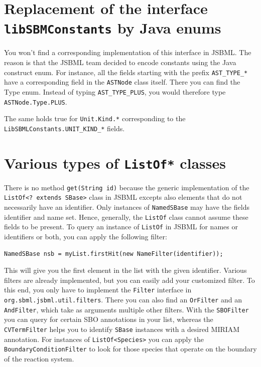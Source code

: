 \documentclass[
  letterpaper,
  11pt,
  headsepline,
  pointlessnumbers,
  tablecaptionabove,
  headinclude,
  appendixprefix,
  idxtotoc,
  bibtotoc
]{scrartcl}
\begin{document}
\section{Replacement of the interface \texttt{libSBMConstants} by Java enums}

You won't find a corresponding implementation of this interface in 
JSBML. The reason is that the JSBML team decided to encode constants using the
Java construct enum. For instance, all the fields starting with the
prefix \verb!AST_TYPE_*! have a corresponding field in the \verb!ASTNode! class
itself. There you can find the Type enum. Instead of typing
\verb!AST_TYPE_PLUS!, you would therefore type \verb!ASTNode.Type.PLUS!.

The same holds true for \verb!Unit.Kind.*! corresponding to the 
\verb!LibSBMLConstants.UNIT_KIND_*! fields.


\section{Various types of \texttt{ListOf*} classes}

There is no method \verb!get(String id)! because the generic implementation of 
the \verb!ListOf<? extends SBase>! class in JSBML excepts also elements that do 
not necessarily have an identifier. Only instances of \verb!NamedSBase! may have
the fields identifier and name set. Hence, generally, the \verb!ListOf! class 
cannot assume these fields to be present. To query an instance of \verb!ListOf! 
in JSBML for names or identifiers or both, you can apply the following 
filter:
\begin{verbatim}
NamedSBase nsb = myList.firstHit(new NameFilter(identifier));
\end{verbatim}
This will give you the first element in the list with the given identifier.
Various filters are already implemented, but you can easily add your 
customized filter. To this end, you only have to implement the \verb!Filter! 
interface in \verb!org.sbml.jsbml.util.filters!. There you can also find an
\verb!OrFilter! and an \verb!AndFilter!, which take as arguments multiple other
filters. With the \verb!SBOFilter! you can query for certain SBO annotations in
your list, whereas the \verb!CVTermFilter! helps you to identify \verb!SBase!
instances with a desired MIRIAM annotation. For instances of
\verb!ListOf<Species>! you can apply the \verb!BoundaryConditionFilter! to look
for those species that operate on the boundary of the reaction system.
\end{document}

